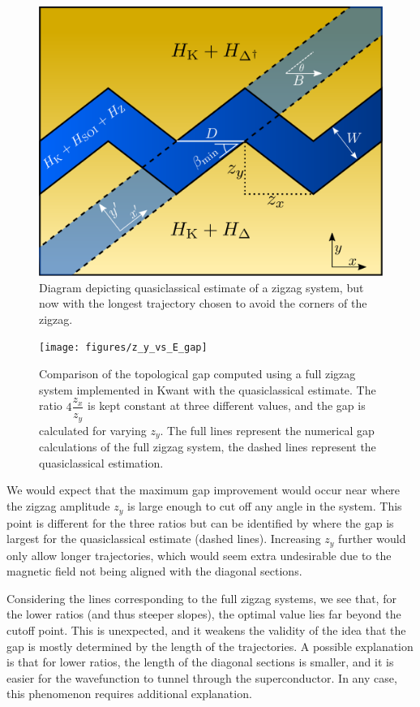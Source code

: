 			\begin{figure}
			\centering
			\includegraphics[width=0.45\columnwidth]{images/longest_trajectory_wo_corners}
			\caption{Diagram depicting quasiclassical estimate of a zigzag system, but now with the longest trajectory chosen to avoid the corners of the zigzag.}
			\label{fig:quasiclassical_approximation}
			\end{figure}

			\begin{figure}[!htb]
			\centering
			\texttt{[image: figures/z\_y\_vs\_E\_gap]}
			\caption{Comparison of the topological gap computed using a full zigzag system implemented in Kwant with the quasiclassical estimate.
			The ratio $4\dfrac{z_x}{z_y}$ is kept constant at three different values, and the gap is calculated for varying $z_y$.
			The full lines represent  the numerical gap calculations of the full zigzag system, the dashed lines represent the quasiclassical estimation.}
			\label{fig:quasiclassical_approximation}
			\end{figure}


			We would expect that the maximum gap improvement would occur near where the zigzag amplitude $z_y$ is large enough to cut off any angle in the system.
			This point is different for the three ratios but can be identified by where the gap is largest for the quasiclassical estimate (dashed lines).
			Increasing $z_y$ further would only allow longer trajectories, which would seem extra undesirable due to the magnetic field not being aligned with the diagonal sections.
			
			Considering the lines corresponding to the full zigzag systems, we see that, for the lower ratios (and thus steeper slopes), the optimal value lies far beyond the cutoff point.
			This is unexpected, and it weakens the validity of the idea that the gap is mostly determined by the length of the trajectories.
			A possible explanation is that for lower ratios, the length of the diagonal sections is smaller, and it is easier for the wavefunction to tunnel through the superconductor.
			In any case, this phenomenon requires additional explanation.

